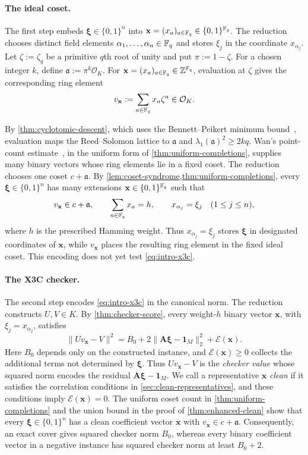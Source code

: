 \paragraph{The ideal coset.}
The first step embeds $\boldsymbol\xi\in\{0,1\}^n$ into
$\mathbf x=(x_a)_{a\in\mathbb F_q}\in\{0,1\}^{\mathbb F_q}$.  The reduction chooses distinct
field elements $\alpha_1,\ldots,\alpha_n\in\mathbb F_q$ and stores $\xi_j$ in the
coordinate $x_{\alpha_j}$.  Let $\zeta:=\zeta_q$ be a primitive $q$th
root of unity and put $\pi:=1-\zeta$.  For a chosen integer $k$, define
$\mathfrak a:=\pi^k\mathcal{O}_K$.  For
$\mathbf x=(x_a)_{a\in\mathbb F_q}\in\mathbb Z^{\mathbb F_q}$, evaluation at $\zeta$ gives the
corresponding ring element
\[
 v_{\mathbf x}:=\sum_{a\in\mathbb F_q}x_a\zeta^a\in\mathcal{O}_K.
\]

By \cref{thm:cyclotomic-descent}, which uses the Bennett--Peikert minimum
bound~\cite{BennettPeikert23}, evaluation maps the Reed--Solomon lattice to
$\mathfrak a$ and $\lambda_1(\mathfrak a)^2\ge2kq$.  Wan's point-count
estimate~\cite{wan2026np}, in the uniform form of
\cref{thm:uniform-completions}, supplies many binary vectors whose ring
elements lie in a fixed coset.  The reduction chooses one coset
$c+\mathfrak a$.  By
\cref{lem:coset-syndrome,thm:uniform-completions}, every
$\boldsymbol\xi\in\{0,1\}^n$ has many extensions
$\mathbf x\in\{0,1\}^{\mathbb F_q}$ such that
\[
 v_{\mathbf x}\in c+\mathfrak a,
 \qquad \sum_{a\in\mathbb F_q}x_a=h,
 \qquad x_{\alpha_j}=\xi_j\quad(1\le j\le n),
\]
where $h$ is the prescribed Hamming weight.  Thus
$x_{\alpha_j}=\xi_j$ stores $\boldsymbol\xi$ in designated coordinates of
$\mathbf x$, while $v_{\mathbf x}$ places the resulting ring element in the
fixed ideal coset.  This encoding does not yet test
\cref{eq:intro-x3c}.

\paragraph{The X3C checker.}
 The second step encodes \cref{eq:intro-x3c} in the canonical norm.
The reduction
constructs $U,V\in K$.  By \cref{thm:checker-score}, every weight-$h$ binary
vector $\mathbf x$, with $\xi_j=x_{\alpha_j}$, satisfies
\begin{equation}
 \|Uv_{\mathbf x}-V\|^2
 =B_0+2\|\mathbf A\boldsymbol\xi-\mathbf1_M\|_2^2
   +\mathcal E(\mathbf x).
\end{equation}
Here $B_0$ depends only on the constructed instance, and
$\mathcal E(\mathbf x)\ge0$ collects the additional terms not determined by
$\boldsymbol\xi$.  Thus $Uv_{\mathbf x}-V$ is the \emph{checker value} whose
squared norm encodes the residual
$\mathbf A\boldsymbol\xi-\mathbf1_M$.  We call a representative
$\mathbf x$ \emph{clean} if it satisfies the correlation conditions in
\cref{sec:clean-representatives}, and these conditions imply
$\mathcal E(\mathbf x)=0$.  The uniform coset count in
\cref{thm:uniform-completions} and the union bound in the proof of
 \cref{thm:enhanced-clean} show that every
 $\boldsymbol\xi\in\{0,1\}^n$ has a clean coefficient vector
 $\mathbf x$ with $v_{\mathbf x}\in c+\mathfrak a$.
Consequently, an exact cover gives squared checker norm $B_0$, whereas every
binary coefficient vector in a negative instance has squared checker norm at
least $B_0+2$.

